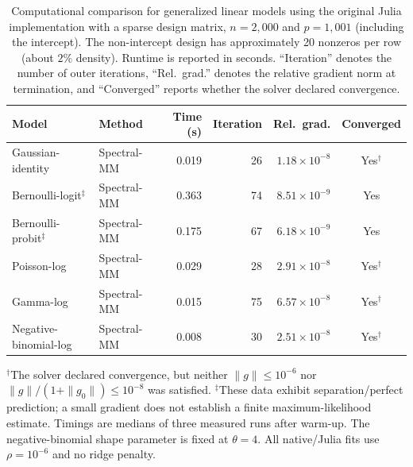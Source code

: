 \clearpage

\begin{table}[htbp]
\centering
\small
\setlength{\tabcolsep}{4pt}
\caption{
Computational comparison for generalized linear models using the original Julia implementation with a sparse design matrix,
$n=2{,}000$ and $p=1{,}001$ (including the intercept).
The non-intercept design has approximately 20 nonzeros per row (about $2\%$ density).
Runtime is reported in seconds. ``Iteration\textquotedblright{} denotes the number of outer iterations,
``Rel.\ grad.\textquotedblright{} denotes the relative gradient norm at termination, and
``Converged\textquotedblright{} reports whether the solver declared convergence.}
\label{tab:julia-glm-comparison-sparse}
\begin{tabular}{llrrrc}
\toprule
Model & Method & Time (s) & Iteration & Rel.\ grad. & Converged \\
\midrule

Gaussian-identity
& Spectral-MM & 0.019 & 26 & $1.18\times10^{-8}$ & Yes$^{\dagger}$ \\
\midrule

Bernoulli-logit$^{\ddagger}$
& Spectral-MM & 0.363 & 74 & $8.51\times10^{-9}$ & Yes \\
\midrule

Bernoulli-probit$^{\ddagger}$
& Spectral-MM & 0.175 & 67 & $6.18\times10^{-9}$ & Yes \\
\midrule

Poisson-log
& Spectral-MM & 0.029 & 28 & $2.91\times10^{-8}$ & Yes$^{\dagger}$ \\
\midrule

Gamma-log
& Spectral-MM & 0.015 & 75 & $6.57\times10^{-8}$ & Yes$^{\dagger}$ \\
\midrule

Negative-binomial-log
& Spectral-MM & 0.008 & 30 & $2.51\times10^{-8}$ & Yes$^{\dagger}$ \\

\bottomrule
\end{tabular}
\par\smallskip
\begin{minipage}{\linewidth}
\footnotesize
$^{\dagger}$The solver declared convergence, but neither $\|g\|\leq 10^{-6}$ nor
$\|g\|/(1+\|g_0\|)\leq 10^{-8}$ was satisfied.
$^{\ddagger}$These data exhibit separation/perfect prediction; a small gradient does not establish a finite maximum-likelihood estimate.
Timings are medians of three measured runs after warm-up.
The negative-binomial shape parameter is fixed at $\theta=4$.
All native/Julia fits use $\rho=10^{-6}$ and no ridge penalty.
\end{minipage}
\end{table}

